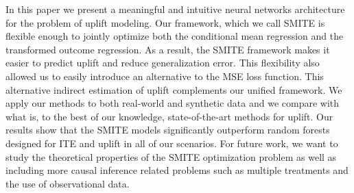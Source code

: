 \documentclass{article}
\begin{document}
In this paper we present a meaningful and intuitive neural networks architecture for the problem of uplift modeling. Our framework, which we call SMITE is flexible enough to jointly optimize both the conditional mean regression and the transformed outcome regression. As a result, the SMITE framework makes it easier to predict uplift and reduce generalization error. This flexibility also allowed us to easily introduce an alternative to the MSE loss function. This alternative indirect estimation of uplift complements our unified framework. We apply our methods to both real-world and synthetic data and we compare with what is, to the best of our knowledge, state-of-the-art methods for uplift. Our results show that the SMITE models significantly outperform random forests designed for ITE and uplift in all of our scenarios. For future work, we want to study the theoretical properties of the SMITE optimization problem as well as including more causal inference related problems such as multiple treatments and the use of observational data.










\end{document}
